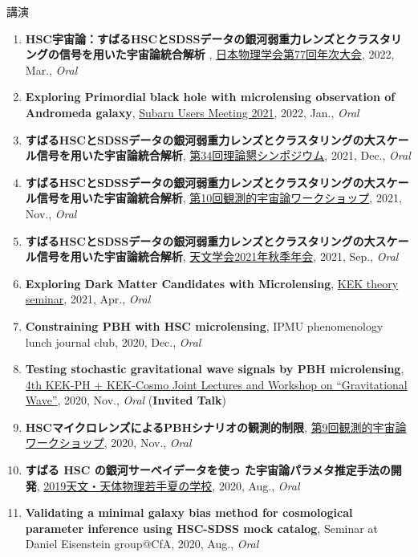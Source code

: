\begin{rSection}{講演}
\begin{enumerate}
\item \textbf{HSC宇宙論：すばるHSCとSDSSデータの銀河弱重力レンズとクラスタリングの信号を用いた宇宙論統合解析 }, \href{https://www.jps.or.jp/activities/meetings/annual/annual-index.php}{日本物理学会第77回年次大会}, 2022, Mar., \textit{Oral}
\item \textbf{Exploring Primordial black hole with microlensing observation of Andromeda galaxy}, \href{https://subarutelescope.org/Science/SubaruUM/SubaruUM2021/}{Subaru Users Meeting 2021}, 2022, Jan., \textit{Oral}
\item \textbf{すばるHSCとSDSSデータの銀河弱重力レンズとクラスタリングの大スケール信号を用いた宇宙論統合解析}, \href{https://sites.google.com/view/rironkon2021/}{第34回理論懇シンポジウム}, 2021, Dec., \textit{Oral}
\item \textbf{すばるHSCとSDSSデータの銀河弱重力レンズとクラスタリングの大スケール信号を用いた宇宙論統合解析}, \href{https://sites.google.com/view/obscosmws2021main}{第10回観測的宇宙論ワークショップ}, 2021, Nov., \textit{Oral}
\item \textbf{すばるHSCとSDSSデータの銀河弱重力レンズとクラスタリングの大スケール信号を用いた宇宙論統合解析}, \href{https://www.asj.or.jp/nenkai/archive/2021b/pdf/U05a.pdf}{天文学会2021年秋季年会}, 2021, Sep., \textit{Oral}
\item \textbf{Exploring Dark Matter Candidates with Microlensing}, \href{https://www.kek.jp/ja/conference/20210407-3/}{KEK theory seminar}, 2021, Apr., \textit{Oral}
\item \textbf{Constraining PBH with HSC microlensing}, IPMU phenomenology lunch journal club, 2020, Dec., \textit{Oral}
\item \textbf{Testing stochastic gravitational wave signals by PBH microlensing}, \href{http://conference-indico.kek.jp/event/117/timetable/#day-2020-11-04}{4th KEK-PH + KEK-Cosmo Joint Lectures and Workshop on ``Gravitational Wave''}, 2020, Nov., \textit{Oral} (\textbf{Invited Talk})
\item \textbf{HSCマイクロレンズによるPBHシナリオの観測的制限}, \href{https://indico.ipmu.jp/event/382/timetable/#all}{第9回観測的宇宙論ワークショップ}, 2020, Nov., \textit{Oral}
\item \textbf{すばる HSC の銀河サーベイデータを使っ た宇宙論パラメタ推定手法の開発}, \href{http://www.astro-wakate.org/ss2019/web/}{2019天文・天体物理若手夏の学校}, 2020, Aug., \textit{Oral}
\item \textbf{Validating a minimal galaxy bias method for cosmological parameter inference using HSC-SDSS mock catalog}, Seminar at Daniel Eisenstein group@CfA, 2020, Aug., \textit{Oral}

\end{enumerate}
\end{rSection}
